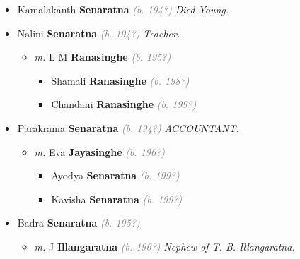 \documentclass[10pt, openany]{book}
\begin{document}
\begin{itemize}
{\begin{itemize}
{\begin{itemize}
{\begin{itemize}
{\begin{itemize}
{\begin{itemize}
\item{Dilukshi \textbf{Senaratna} \textcolor{gray}{\textit{(b. 198?)}}
 }
\item{Nelunika \textbf{Senaratna} \textcolor{gray}{\textit{(b. 198?)}}
 }
\end{itemize}}
\end{itemize}
 }
\item{Kamalakanth \textbf{Senaratna} \textcolor{gray}{\textit{(b. 194?)}} \textcolor{slmaroon}{\textit{Died Young.}}
 }
\item{Nalini \textbf{Senaratna} \textcolor{gray}{\textit{(b. 194?)}} \textcolor{slmaroon}{\textit{Teacher.}}
\begin{itemize}
\item{\textit{m.} L M \textbf{Ranasinghe} \textcolor{gray}{\textit{(b. 195?)}}   \label{couple:00000631:00000753} \begin{itemize}
\item{Shamali \textbf{Ranasinghe} \textcolor{gray}{\textit{(b. 198?)}}
 }
\item{Chandani \textbf{Ranasinghe} \textcolor{gray}{\textit{(b. 199?)}}
 }
\end{itemize}}
\end{itemize}
 }
\item{Parakrama \textbf{Senaratna} \textcolor{gray}{\textit{(b. 194?)}} \textcolor{slmaroon}{\textit{ACCOUNTANT.}}
\begin{itemize}
\item{\textit{m.} Eva \textbf{Jayasinghe} \textcolor{gray}{\textit{(b. 196?)}}   \label{couple:00000327:00000762} \begin{itemize}
\item{Ayodya \textbf{Senaratna} \textcolor{gray}{\textit{(b. 199?)}}
 }
\item{Kavisha \textbf{Senaratna} \textcolor{gray}{\textit{(b. 199?)}}
 }
\end{itemize}}
\end{itemize}
 }
\item{Badra \textbf{Senaratna} \textcolor{gray}{\textit{(b. 195?)}}
\begin{itemize}
\item{\textit{m.} J \textbf{Illangaratna} \textcolor{gray}{\textit{(b. 196?)}} \textcolor{slmaroon}{\textit{Nephew of T. B. Illangaratna.}}   \label{couple:00000254:00000708} \begin{itemize}

\end{itemize}}
\end{itemize}}
\end{itemize}}
\end{itemize}}
\end{itemize}}
\end{itemize}
\end{document}
